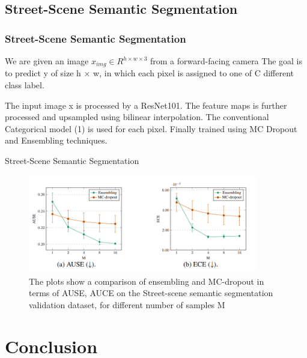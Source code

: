 \documentclass{beamer}
\begin{document}
\subsection{Street-Scene Semantic Segmentation}
\begin{frame}
\frametitle{Street-Scene Semantic Segmentation}

\hspace{0.3cm} We are given an image $x_{img} \in R^{h\times w\times 3}$ from a forward-facing camera The goal is to predict y of size h $\times$ w, in which each pixel is assigned to one of C different class label.

\vspace{0.3cm}

The input image x is processed by a ResNet101. The feature maps is further processed and upsampled using bilinear interpolation. The conventional Categorical model (1) is used for each pixel. Finally trained using MC Dropout and Ensembling techniques.

\end{frame}



\begin{frame}{Street-Scene Semantic Segmentation}

\begin{figure}
\centering
    \includegraphics[width=10cm]{seg.png}
    \caption{The plots show a comparison of ensembling and MC-dropout in terms of AUSE, AUCE on the Street-scene semantic segmentation validation dataset, for different number of samples M}
    \label{fig:question}
\end{figure}

\end{frame}

\section{Conclusion}
\end{document}
